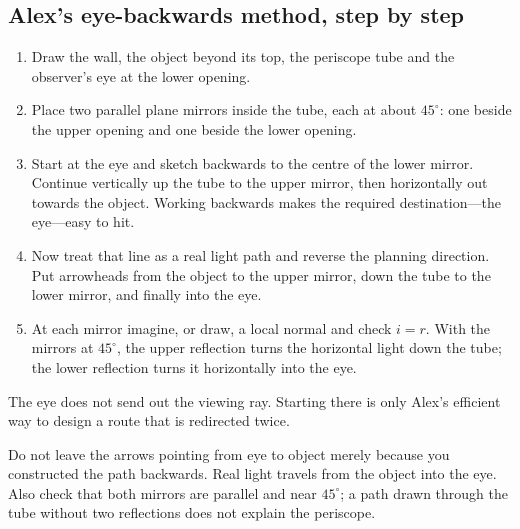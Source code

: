 \documentclass[11pt,a4paper]{article}
\begin{document}
\subsection*{Alex's eye-backwards method, step by step}
\begin{enumerate}
\item Draw the wall, the object beyond its top, the periscope tube and the observer's eye at the lower opening.
\item Place two parallel plane mirrors inside the tube, each at about $45^\circ$: one beside the upper opening and one beside the lower opening.
\item Start at the eye and sketch backwards to the centre of the lower mirror. Continue vertically up the tube to the upper mirror, then horizontally out towards the object. Working backwards makes the required destination---the eye---easy to hit.
\item Now treat that line as a real light path and reverse the planning direction. Put arrowheads from the object to the upper mirror, down the tube to the lower mirror, and finally into the eye.
\item At each mirror imagine, or draw, a local normal and check $i=r$. With the mirrors at $45^\circ$, the upper reflection turns the horizontal light down the tube; the lower reflection turns it horizontally into the eye.
\end{enumerate}

The eye does not send out the viewing ray. Starting there is only Alex's efficient way to design a route that is redirected twice.

\begin{mistakebox}
Do not leave the arrows pointing from eye to object merely because you constructed the path backwards. Real light travels from the object into the eye. Also check that both mirrors are parallel and near $45^\circ$; a path drawn through the tube without two reflections does not explain the periscope.
\end{mistakebox}

\clearpage
\end{document}
